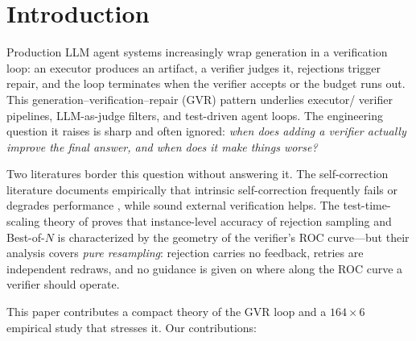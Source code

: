 \documentclass[11pt]{article}
\begin{document}
\section{Introduction}\label{sec:intro}

Production LLM agent systems increasingly wrap generation in a
verification loop: an executor produces an artifact, a verifier
judges it, rejections trigger repair, and the loop terminates when
the verifier accepts or the budget runs out.  This
generation--verification--repair (GVR) pattern underlies executor/
verifier pipelines, LLM-as-judge filters, and test-driven agent
loops.  The engineering question it raises is sharp and often
ignored: \emph{when does adding a verifier actually improve the
final answer, and when does it make things worse?}

Two literatures border this question without answering it.  The
self-correction literature documents empirically that intrinsic
self-correction frequently fails or degrades performance
\citep{stechly2024selfverify,kamoi2024when,huang2024cannot}, while
sound external verification helps.  The test-time-scaling theory of
\citet{dorner2026rocnreroll} proves that instance-level accuracy of
rejection sampling and Best-of-$N$ is characterized by the geometry
of the verifier's ROC curve---but their analysis covers \emph{pure
resampling}: rejection carries no feedback, retries are independent
redraws, and no guidance is given on where along the ROC curve a
verifier should operate.

This paper contributes a compact theory of the GVR loop and a
$164 \times 6$ empirical study that stresses it.  Our contributions:
\end{document}
